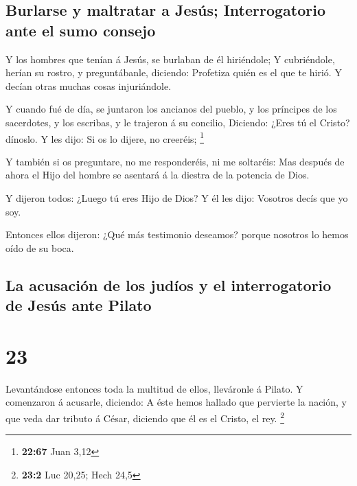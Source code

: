 \hypertarget{burlarse-y-maltratar-a-jesuxfas-interrogatorio-ante-el-sumo-consejo}{%
\subsection{Burlarse y maltratar a Jesús; Interrogatorio ante el sumo
consejo}\label{burlarse-y-maltratar-a-jesuxfas-interrogatorio-ante-el-sumo-consejo}}

 Y los hombres que tenían á Jesús, se burlaban de él
hiriéndole;  Y cubriéndole, herían su rostro, y
preguntábanle, diciendo: Profetiza quién es el que te hirió.
 Y decían otras muchas cosas injuriándole.

 Y cuando fué de día, se juntaron los ancianos del
pueblo, y los príncipes de los sacerdotes, y los escribas, y le trajeron
á su concilio,  Diciendo: ¿Eres tú el Cristo? dínoslo. Y
les dijo: Si os lo dijere, no creeréis; \footnote{\textbf{22:67} Juan
  3,12}

 Y también si os preguntare, no me responderéis, ni me
soltaréis:  Mas después de ahora el Hijo del hombre se
asentará á la diestra de la potencia de Dios.

 Y dijeron todos: ¿Luego tú eres Hijo de Dios? Y él les
dijo: Vosotros decís que yo soy.

 Entonces ellos dijeron: ¿Qué más testimonio deseamos?
porque nosotros lo hemos oído de su boca.

\hypertarget{la-acusaciuxf3n-de-los-juduxedos-y-el-interrogatorio-de-jesuxfas-ante-pilato}{%
\subsection{La acusación de los judíos y el interrogatorio de Jesús ante
Pilato}\label{la-acusaciuxf3n-de-los-juduxedos-y-el-interrogatorio-de-jesuxfas-ante-pilato}}

\hypertarget{section-22}{%
\section{23}\label{section-22}}

 Levantándose entonces toda la multitud de ellos,
lleváronle á Pilato.  Y comenzaron á acusarle, diciendo: A
éste hemos hallado que pervierte la nación, y que veda dar tributo á
César, diciendo que él es el Cristo, el rey. \footnote{\textbf{23:2} Luc
  20,25; Hech 24,5}

